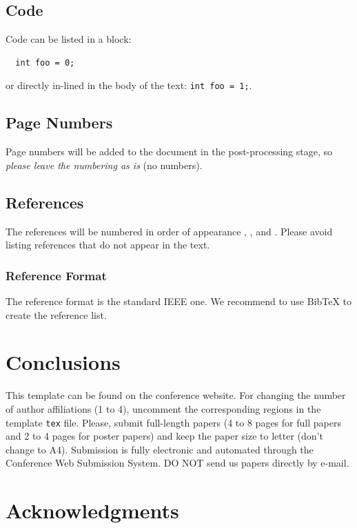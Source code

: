 \documentclass[a4paper]{article}
\begin{document}
\subsection{Code}

Code can be listed in a block:

\begin{lstlisting}
  int foo = 0;
\end{lstlisting}
\noindent
or directly in-lined in the body of the text: \lstinline{int foo = 1;}.

\subsection{Page Numbers}

Page numbers will be added to the document in the post-processing stage, so
{\em please leave the numbering as is} (no numbers).


\subsection{References}

The references will be numbered in order of appearance \cite{Sal89},
\cite{Spa72}, \cite{MosWal64} and \cite{Kay86}. Please avoid listing
references that do not appear in the text.

\subsubsection{Reference Format}

The reference format is the standard IEEE one. We recommend to use BibTeX to
create the reference list.

\section{Conclusions}

This template can be found on the conference website. For changing the number
of author affiliations (1 to 4), uncomment the corresponding regions in the
template \texttt{tex} file. Please, submit full-length papers (4 to 8 pages
for full papers and 2 to 4 pages for poster papers) and keep the paper size to
letter (don't change to A4). Submission is fully electronic and automated 
through the Conference Web Submission System. DO NOT send us papers directly by 
e-mail.

\section{Acknowledgments}
\end{document}
